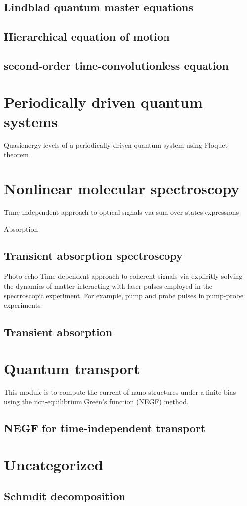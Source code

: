 \documentclass[a4paper,12pt]{book}
\begin{document}
\section{Lindblad quantum master equations} 
\section{Hierarchical equation of motion} 
\section{second-order time-convolutionless equation} 

\chapter{Periodically driven quantum systems} 
Quasienergy levels of a periodically driven quantum system using Floquet theorem


\chapter{Nonlinear molecular spectroscopy} 
Time-independent approach to optical signals via sum-over-states expressions

Absorption
\section{Transient absorption spectroscopy} 
Photo echo
Time-dependent approach to coherent signals via explicitly solving the dynamics of matter interacting with laser pulses employed in the spectroscopic experiment. For example, pump and probe pulses in pump-probe experiments.

\section{Transient absorption} 

\chapter{ Quantum transport} 
This module is to compute the current of nano-structures under a finite bias using the non-equilibrium Green's function (NEGF) method.

\section{NEGF for time-independent transport} 


\chapter{Uncategorized}

\section{Schmdit decomposition}


\backmatter
\end{document}
